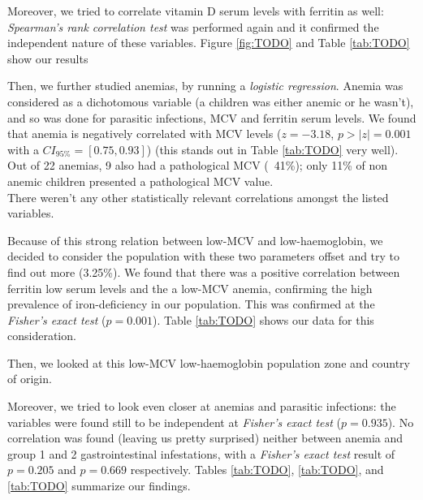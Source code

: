 
Moreover, we tried to correlate vitamin D serum levels with ferritin as well: \textit{Spearman's rank correlation test} was performed again and it confirmed the independent nature of these variables. Figure \ref{fig:TODO} and Table \ref{tab:TODO} show our results



Then, we further studied anemias, by running a \textit{logistic regression}. Anemia was considered as a dichotomous variable (a children was either anemic or he wasn't), and so was done for parasitic infections, MCV and ferritin serum levels. We found that anemia is negatively correlated with MCV levels ($z=-3.18$, $p>|z|=0.001$ with a $CI_{95\%} =[0.75,0.93]$) (this stands out in Table \ref{tab:TODO} very well). Out of 22 anemias, 9 also had a pathological MCV (~41\%); only 11\% of non anemic children presented a pathological MCV value.\\
There weren't any other statistically relevant correlations amongst the listed variables.


Because of this strong relation between low-MCV and low-haemoglobin, we decided to consider the population with these two parameters offset and try to find out more (3.25\%). We found that there was a positive correlation between ferritin low serum levels and the a low-MCV anemia, confirming the high prevalence of iron-deficiency in our population. This was confirmed at the \textit{Fisher's exact test} ($p=0.001$). Table \ref{tab:TODO} shows our data for this consideration.


Then, we looked at this low-MCV low-haemoglobin population zone and country of origin.

Moreover, we tried to look even closer at anemias and parasitic infections: the variables were found still to be independent at \textit{Fisher's exact test} ($p=0.935$). No correlation was found (leaving us pretty surprised) neither between anemia and group 1 and 2 gastrointestinal infestations, with a \textit{Fisher's exact test} result of $p=0.205$ and $p=0.669$ respectively. Tables \ref{tab:TODO}, \ref{tab:TODO}, and \ref{tab:TODO} summarize our findings.


